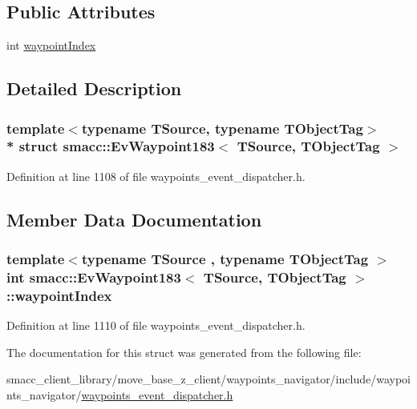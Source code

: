 \subsection*{Public Attributes}
\begin{DoxyCompactItemize}
\item 
int \hyperlink{structsmacc_1_1EvWaypoint183_ad0b456a7561f3016b83a337ca6e896e6}{waypoint\+Index}
\end{DoxyCompactItemize}


\subsection{Detailed Description}
\subsubsection*{template$<$typename T\+Source, typename T\+Object\+Tag$>$\\*
struct smacc\+::\+Ev\+Waypoint183$<$ T\+Source, T\+Object\+Tag $>$}



Definition at line 1108 of file waypoints\+\_\+event\+\_\+dispatcher.\+h.



\subsection{Member Data Documentation}
\subsubsection[{\texorpdfstring{waypoint\+Index}{waypointIndex}}]{\setlength{\rightskip}{0pt plus 5cm}template$<$typename T\+Source , typename T\+Object\+Tag $>$ int {\bf smacc\+::\+Ev\+Waypoint183}$<$ T\+Source, T\+Object\+Tag $>$\+::waypoint\+Index}\hypertarget{structsmacc_1_1EvWaypoint183_ad0b456a7561f3016b83a337ca6e896e6}{}\label{structsmacc_1_1EvWaypoint183_ad0b456a7561f3016b83a337ca6e896e6}


Definition at line 1110 of file waypoints\+\_\+event\+\_\+dispatcher.\+h.



The documentation for this struct was generated from the following file\+:\begin{DoxyCompactItemize}
\item 
smacc\+\_\+client\+\_\+library/move\+\_\+base\+\_\+z\+\_\+client/waypoints\+\_\+navigator/include/waypoints\+\_\+navigator/\hyperlink{waypoints__event__dispatcher_8h}{waypoints\+\_\+event\+\_\+dispatcher.\+h}\end{DoxyCompactItemize}
